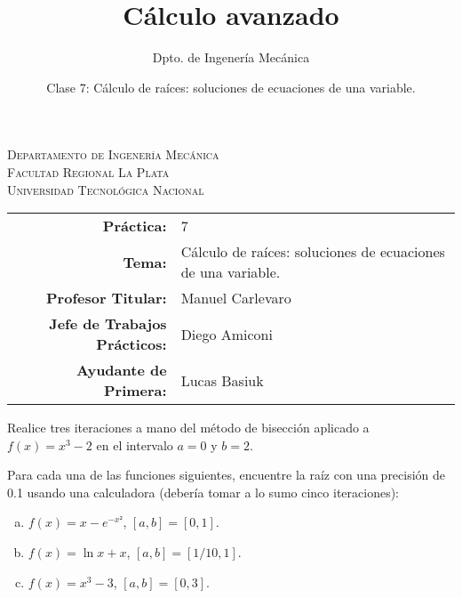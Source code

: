 \documentclass[11pt]{article}
\title{Cálculo avanzado}
\author{Dpto. de Ingenería Mecánica}
\date{Clase 7: Cálculo de raíces: soluciones de ecuaciones de una variable.}
\begin{document}

\begin{center}
\end{center} 

\begin{center}
\vspace{\baselineskip}
\Large{\textsc{Departamento de Ingenería Mecánica}} \\
\textsc{Facultad Regional La Plata} \\
\textsc{Universidad Tecnológica Nacional}
\end{center}


\begin{center}
\begin{tabular}{r l}
    \textbf{Práctica:} & 7 \\
 \textbf{Tema:} & Cálculo de raíces: soluciones de ecuaciones de una variable. \\
 \textbf{Profesor Titular:} & Manuel Carlevaro \\
 \textbf{Jefe de Trabajos Prácticos:} & Diego Amiconi \\
 \textbf{Ayudante de Primera:} & Lucas Basiuk 
\end{tabular}\end{center}

\vspace{1em}

\begin{question} %
Realice tres iteraciones a mano del método de bisección aplicado a $f(x) = x^3 - 2$ en el intervalo $a = 0$ y $b=2$.
\end{question}

\begin{question} %
Para cada una de las funciones siguientes, encuentre la raíz con una precisión de 0.1 usando una calculadora (debería tomar a lo sumo cinco iteraciones):
\begin{enumerate}[a)]
    \item $f(x) = x - e^{-x²}$, $[a, b] = [0, 1]$.
    \item $f(x) = \ln x + x$,  $[a, b] = [1/10, 1]$.
    \item $f(x) = x^3 - 3$,  $[a, b] = [0, 3]$.
\end{enumerate}
\end{question}
\end{document}
